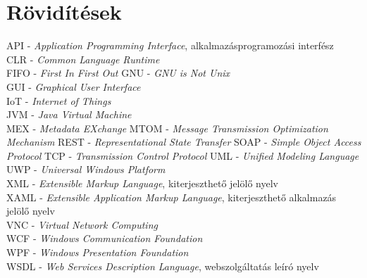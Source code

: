 \chapter*{Rövidítések}

API  - \textit{Application Programming Interface}, alkalmazásprogramozási interfész\\
CLR  - \textit{Common Language Runtime}\\
FIFO - \textit{First In First Out}
GNU  - \textit{GNU is Not Unix}\\
GUI  - \textit{Graphical User Interface}\\
IoT  - \textit{Internet of Things}\\
JVM  - \textit{Java Virtual Machine}\\
MEX  - \textit{Metadata EXchange}
MTOM - \textit{Message Transmission Optimization Mechanism}
REST - \textit{Representational State Transfer}
SOAP - \textit{Simple Object Access Protocol}
TCP  - \textit{Transmission Control Protocol}
UML  - \textit{Unified Modeling Language}\\
UWP  - \textit{Universal Windows Platform}\\
XML  - \textit{Extensible Markup Language}, kiterjeszthető jelölő nyelv\\
XAML - \textit{Extensible Application Markup Language}, kiterjeszthető alkalmazás jelölő nyelv\\
VNC  - \textit{Virtual Network Computing}\\
WCF  - \textit{Windows Communication Foundation}\\
WPF  - \textit{Windows Presentation Foundation}\\
WSDL - \textit{Web Services Description Language}, webszolgáltatás leíró nyelv